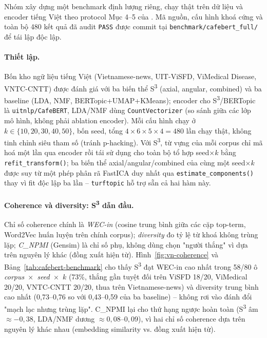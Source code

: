 \documentclass[11pt]{article}
\begin{document}
Nhóm xây dựng một benchmark định lượng riêng, chạy thật trên dữ liệu và
encoder tiếng Việt theo protocol Mục 4--5 của \citep{kardos2025s3}. Mã
nguồn, cấu hình khoá cứng và toàn bộ 480 kết quả đã audit \texttt{PASS}
được commit tại \texttt{benchmark/cafebert\_full/} để tái lập độc lập.

\paragraph{Thiết lập.} Bốn kho ngữ liệu tiếng Việt (Vietnamese-news,
UIT-ViSFD, ViMedical Disease, VNTC-CNTT) được đánh giá với ba biến thể
S\textsuperscript{3} (axial, angular, combined) và ba baseline (LDA, NMF,
BERTopic+UMAP+KMeans); encoder cho S\textsuperscript{3}/BERTopic là
\texttt{uitnlp/CafeBERT}, LDA/NMF dùng \texttt{CountVectorizer} (so sánh
giữa các lớp mô hình, không phải ablation encoder). Mỗi cấu hình chạy ở
$k \in \{10,20,30,40,50\}$, bốn seed, tổng $4\times6\times5\times4=480$
lần chạy thật, không tinh chỉnh siêu tham số (tránh p-hacking). Với
S\textsuperscript{3}, từ vựng của mỗi corpus chỉ mã hoá một lần qua
encoder rồi tái sử dụng cho toàn bộ tổ hợp seed$\times k$ bằng
\texttt{refit\_transform()}; ba biến thể axial/angular/combined của
cùng một seed$\times k$ được suy từ một phép phân rã FastICA duy nhất
qua \texttt{estimate\_components()} thay vì fit độc lập ba lần --
\texttt{turftopic} hỗ trợ sẵn cả hai hàm này.

\paragraph{Coherence và diversity: S\textsuperscript{3} dẫn đầu.} Chỉ số
coherence chính là \emph{WEC-in} (cosine trung bình giữa các cặp top-term,
Word2Vec huấn luyện trên chính corpus); \emph{diversity} đo tỷ lệ từ khoá
không trùng lặp; \emph{C\_NPMI} (Gensim) là chỉ số phụ, không dùng chọn
"người thắng" vì dựa trên nguyên lý khác (đồng xuất hiện từ). Hình~\ref{fig:vn-coherence}
và Bảng~\ref{tab:cafebert-benchmark} cho thấy S\textsuperscript{3} đạt
WEC-in cao nhất trong 58/80 ô \emph{corpus~$\times$~seed~$\times$~$k$}
(73\%, thắng gần tuyệt đối trên ViSFD 18/20, ViMedical 20/20, VNTC-CNTT
20/20, thua trên Vietnamese-news) và diversity trung bình cao nhất
(0,73--0,76 so với 0,43--0,59 của ba baseline) -- không rơi vào đánh đổi
"mạch lạc nhưng trùng lặp". C\_NPMI lại cho thứ hạng ngược hoàn toàn
(S\textsuperscript{3} âm $\approx-0{,}38$,
LDA/NMF dương $\approx0{,}08$--$0{,}09$), vì hai chỉ số coherence dựa
trên nguyên lý khác nhau (embedding similarity vs. đồng xuất hiện từ).
\end{document}
